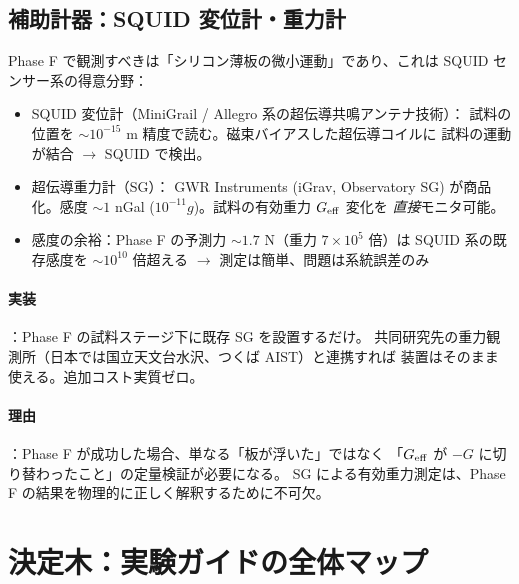 \documentclass[11pt,a4paper]{article}
\def\textbf#1{#1}%
\begin{document}
\subsection{補助計器：SQUID 変位計・重力計}

Phase F で観測すべきは「シリコン薄板の微小運動」であり、これは
\textbf{SQUID センサー系の得意分野}：

\begin{itemize}
\item \textbf{SQUID 変位計}（MiniGrail / Allegro 系の超伝導共鳴アンテナ技術）：
  試料の位置を $\sim 10^{-15}$ m 精度で読む。磁束バイアスした超伝導コイルに
  試料の運動が結合 $\to$ SQUID で検出。
\item \textbf{超伝導重力計（SG）}：
  GWR Instruments (iGrav, Observatory SG) が商品化。感度 $\sim 1$ nGal
  ($10^{-11} g$)。試料の有効重力 $G_{\rm eff}$ 変化を \emph{直接}モニタ可能。
\item \textbf{感度の余裕}：Phase F の予測力 $\sim 1.7$ N（重力 $7\times 10^5$ 倍）は
  SQUID 系の既存感度を $\sim 10^{10}$ 倍超える $\to$ 測定は簡単、問題は系統誤差のみ
\end{itemize}

\paragraph{実装}：Phase F の試料ステージ下に既存 SG を設置するだけ。
共同研究先の重力観測所（日本では国立天文台水沢、つくば AIST）と連携すれば
装置はそのまま使える。追加コスト実質ゼロ。

\paragraph{理由}：Phase F が成功した場合、単なる「板が浮いた」ではなく
\textbf{「$G_{\rm eff}$ が $-G$ に切り替わったこと」の定量検証}が必要になる。
SG による有効重力測定は、Phase F の結果を物理的に正しく解釈するために不可欠。

\newpage

\section{決定木：実験ガイドの全体マップ}
\end{document}
